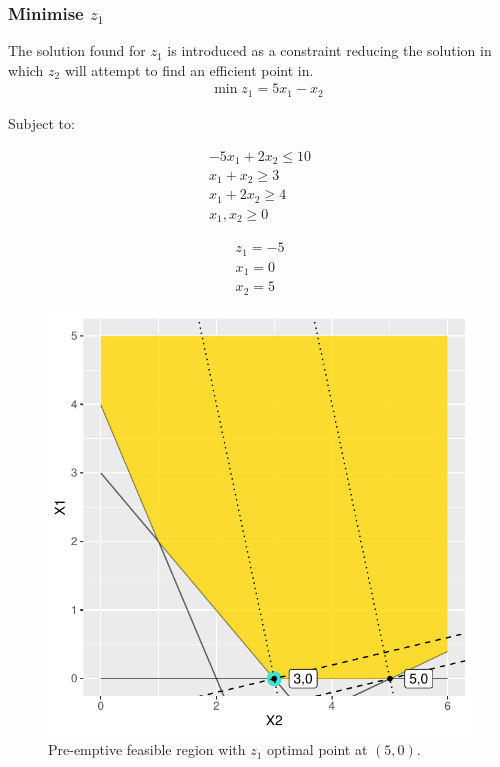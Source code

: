 \documentclass[a4paper,11pt]{article}
\begin{document}
\subsubsection{Minimise $z_1$}
The solution found for $z_1$ is introduced as a constraint reducing the solution in which $z_2$ will attempt to find an efficient point in.
\begin{align}
	\quad \min z_1 = 5x_1 - x_2
\end{align}

Subject to:

\begin{align}
	-5x_1 + 2x_2 \leq 10\\
	x_1 + x_2 \geq 3\\
	x_1 + 2x_2 \geq 4\\
	x_1,x_2 \geq 0
\end{align}

\begin{align}
	z_1 = -5 \\
	x_1 = 0 \\
	x_2 = 5
\end{align}

\begin{figure}[H]
    \centering
    \includegraphics{../R/Pre_emptive}
    \caption{Pre-emptive feasible region with $z_1$ optimal point at $(5,0)$.}
    \label{eff_front}
\end{figure}
\end{document}
